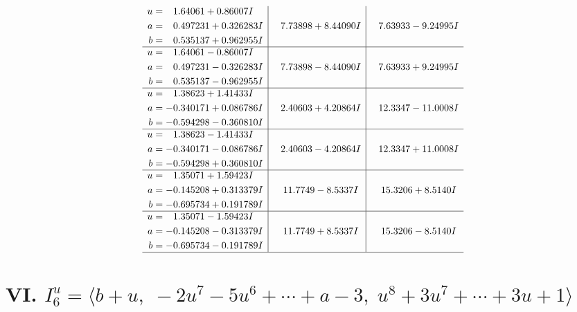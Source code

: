 \documentclass[1p]{elsarticle_modified}
\theoremstyle{definition}
\begin{document}
$$\begin{array}{c|c|c}
\begin{aligned}
u &= \phantom{-}1.64061 + 0.86007 I \\
a &= \phantom{-}0.497231 + 0.326283 I \\
b &= \phantom{-}0.535137 + 0.962955 I\end{aligned}
 & \phantom{-}7.73898 + 8.44090 I & \phantom{-}7.63933 - 9.24995 I \\ \hline\begin{aligned}
u &= \phantom{-}1.64061 - 0.86007 I \\
a &= \phantom{-}0.497231 - 0.326283 I \\
b &= \phantom{-}0.535137 - 0.962955 I\end{aligned}
 & \phantom{-}7.73898 - 8.44090 I & \phantom{-}7.63933 + 9.24995 I \\ \hline\begin{aligned}
u &= \phantom{-}1.38623 + 1.41433 I \\
a &= -0.340171 + 0.086786 I \\
b &= -0.594298 - 0.360810 I\end{aligned}
 & \phantom{-}2.40603 + 4.20864 I & \phantom{-}12.3347 - 11.0008 I \\ \hline\begin{aligned}
u &= \phantom{-}1.38623 - 1.41433 I \\
a &= -0.340171 - 0.086786 I \\
b &= -0.594298 + 0.360810 I\end{aligned}
 & \phantom{-}2.40603 - 4.20864 I & \phantom{-}12.3347 + 11.0008 I \\ \hline\begin{aligned}
u &= \phantom{-}1.35071 + 1.59423 I \\
a &= -0.145208 + 0.313379 I \\
b &= -0.695734 + 0.191789 I\end{aligned}
 & \phantom{-}11.7749 - 8.5337 I & \phantom{-}15.3206 + 8.5140 I \\ \hline\begin{aligned}
u &= \phantom{-}1.35071 - 1.59423 I \\
a &= -0.145208 - 0.313379 I \\
b &= -0.695734 - 0.191789 I\end{aligned}
 & \phantom{-}11.7749 + 8.5337 I & \phantom{-}15.3206 - 8.5140 I\\
 \hline 
 \end{array}$$\newpage\newpage\renewcommand{\arraystretch}{1}
\centering \section*{VI. $I^u_{6}= \langle b+u,\;-2 u^7-5 u^6+\cdots+a-3,\;u^8+3 u^7+\cdots+3 u+1 \rangle$}
\end{document}
